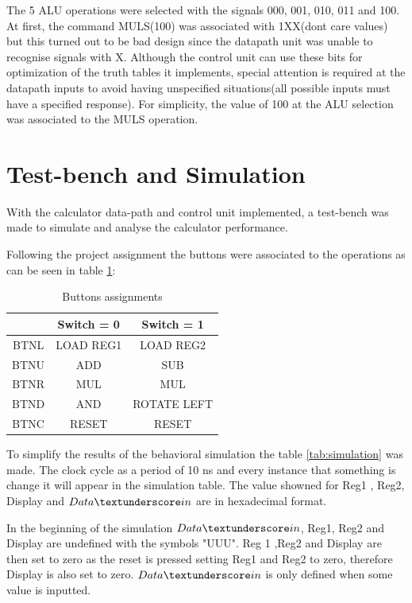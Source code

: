 \documentclass[12pt]{article}
\begin{document}
The 5 ALU operations were selected with the signals 000, 001, 010, 011 and 100. At first, the command MULS(100) was associated with 1XX(dont care values) but this turned out to be bad design since the datapath unit was unable to recognise signals with X. Although the control unit can use these bits for optimization of the truth tables it implements, special attention is required at the datapath inputs to avoid having unspecified situations(all possible inputs must have a specified response). For simplicity, the value of 100 at the ALU selection was associated to the MULS operation.

\section{Test-bench and Simulation}
With the calculator data-path and control unit implemented, a test-bench was made to simulate and analyse the calculator performance. 

Following the project assignment the buttons were associated to the operations as  can be seen in table \ref{BUTTONS}:

\begin{table}[H]
	\centering
	\begin{tabular}{|c|c|c|}
        \hline
		    & Switch = 0 & Switch = 1\\
      \hline
		  BTNL  & LOAD REG1 & LOAD REG2 \\
    \hline
		BTNU    & ADD & SUB\\
    \hline
		BTNR    & MUL & MUL \\
    \hline
		BTND   & AND & ROTATE LEFT\\
    \hline
        BTNC   & RESET & RESET \\
        \hline
		
	\end{tabular}
	\caption{Buttons assignments}
	\label{BUTTONS}
\end{table}

To simplify the results of the behavioral simulation the table \ref{tab:simulation} was made. The clock cycle as a period of 10 ns and every instance that something is change it will appear in the simulation table. The value showned for Reg1 , Reg2, Display and $Data\textunderscore in$ are in hexadecimal format.

In the beginning of the simulation $Data\textunderscore in$, Reg1, Reg2 and Display are undefined with the symbols "UUU". Reg 1 ,Reg2 and Display are then set to zero as the reset is pressed setting Reg1 and Reg2 to zero, therefore Display is also set to zero. $Data\textunderscore in$ is only defined when some value is inputted. 
\end{document}
